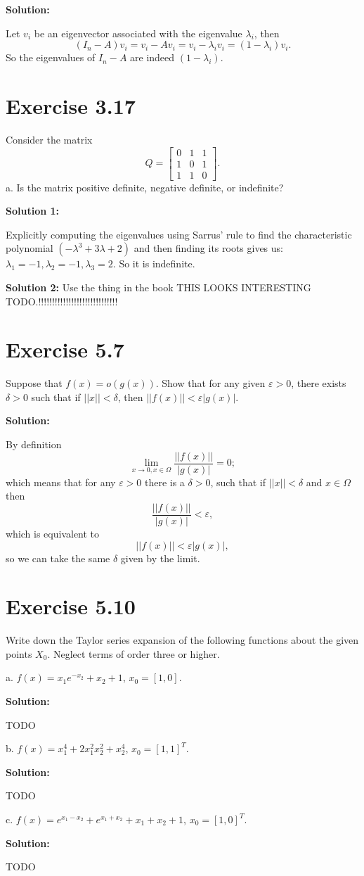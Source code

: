 \documentclass{article}
\begin{document}
\textbf{Solution:}

Let $v_i$ be an eigenvector associated with the eigenvalue $\lambda_i$, then
\[
	(I_n-A)v_i=v_i-Av_i=v_i-\lambda_iv_i=(1-\lambda_i)v_i.
\]
So the eigenvalues of $I_n-A$ are indeed $(1-\lambda_i)$.
\section*{Exercise 3.17}
Consider the matrix
\[ Q=
\begin{bmatrix}
0 & 1 & 1\\	
1 & 0 & 1\\
1 & 1 & 0
\end{bmatrix}.
\]
a. Is the matrix positive definite, negative definite, or indefinite?

\textbf{Solution 1:}

Explicitly computing the eigenvalues using Sarrus' rule to find the characteristic
polynomial $(-\lambda^3+3\lambda+2)$ and then finding its roots gives us:\\
$\lambda_1=-1,\lambda_2=-1,\lambda_3=2$. So it is indefinite.

\textbf{Solution 2:}
Use the thing in the book THIS LOOKS INTERESTING TODO.!!!!!!!!!!!!!!!!!!!!!!!!!!!!!
\section*{Exercise 5.7}
Suppose that $f(x)=o(g(x))$. Show that for any given $\varepsilon >0$, there
exists $\delta>0$ such that if $||x||< \delta$, then $||f(x)||<\varepsilon |g(x)|$.

\textbf{Solution:}

By definition
\[
	\lim_{x\to 0,x\in\Omega} \frac{||f(x)||}{|g(x)|}=0;
\]
which means that for any $\varepsilon >0$ there is a $\delta>0$, such that if
$||x||<\delta$ and $x\in\Omega$ then
\[
	\frac{||f(x)||}{|g(x)|}<\varepsilon,
\]
which is equivalent to
\[
	||f(x)||<\varepsilon|g(x)|,
\]
so we can take the same $\delta$ given by the limit.
\section*{Exercise 5.10}
Write down the Taylor series expansion of the following functions about the
given points $X_0$. Neglect terms of order three or higher.

a. $f(x)=x_1e^{-x_2}+x_2+1$, $x_0=[1,0]$.

\textbf{Solution:}

TODO

b. $f(x)=x_1^4+2x_1^2x_2^2 +x_2^4$, $x_0=[1,1]^T$.

\textbf{Solution:}

TODO

c. $f(x)=e^{x_1-x_2}+e^{x_1+x_2}+x_1+x_2+1$, $x_0=[1,0]^T$.

\textbf{Solution:}

TODO
\end{document}
